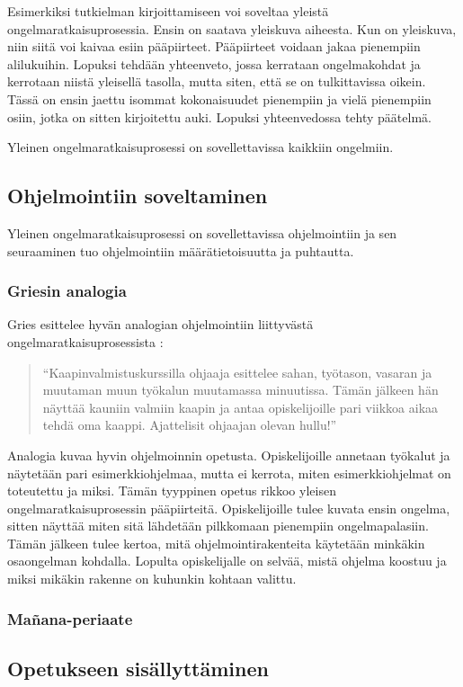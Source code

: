 Esimerkiksi tutkielman kirjoittamiseen voi soveltaa yleistä
ongelmaratkaisuprosessia. Ensin on saatava yleiskuva aiheesta. Kun on yleiskuva,
niin siitä voi kaivaa esiin pääpiirteet. Pääpiirteet voidaan jakaa pienempiin
alilukuihin. Lopuksi tehdään yhteenveto, jossa kerrataan ongelmakohdat ja
kerrotaan niistä yleisellä tasolla, mutta siten, että se on tulkittavissa
oikein. Tässä on ensin jaettu isommat kokonaisuudet pienempiin ja vielä
pienempiin osiin, jotka on sitten kirjoitettu auki. Lopuksi yhteenvedossa tehty
päätelmä.

Yleinen ongelmaratkaisuprosessi on sovellettavissa kaikkiin ongelmiin.

\subsection{Ohjelmointiin soveltaminen}

Yleinen ongelmaratkaisuprosessi on sovellettavissa ohjelmointiin ja sen
seuraaminen tuo ohjelmointiin määrätietoisuutta ja puhtautta.

\subsubsection{Griesin analogia}

Gries esittelee hyvän analogian ohjelmointiin liittyvästä
ongelmaratkaisuprosessista \cite{Gries:1974:WTI:953057.810447}:

\begin{quotation}
``Kaapinvalmistuskurssilla ohjaaja esittelee sahan, työtason, vasaran ja
muutaman muun työkalun muutamassa minuutissa. Tämän jälkeen hän näyttää
kauniin valmiin kaapin ja antaa opiskelijoille pari viikkoa aikaa tehdä oma
kaappi. Ajattelisit ohjaajan olevan hullu!''
\end{quotation}

Analogia kuvaa hyvin ohjelmoinnin opetusta. Opiskelijoille annetaan työkalut ja
näytetään pari esimerkkiohjelmaa, mutta ei kerrota, miten esimerkkiohjelmat on
toteutettu ja miksi. Tämän tyyppinen opetus rikkoo yleisen
ongelmaratkaisuprosessin pääpiirteitä. Opiskelijoille tulee kuvata ensin
ongelma, sitten näyttää miten sitä lähdetään pilkkomaan pienempiin
ongelmapalasiin. Tämän jälkeen tulee kertoa, mitä ohjelmointirakenteita
käytetään minkäkin osaongelman kohdalla. Lopulta opiskelijalle on selvää, mistä
ohjelma koostuu ja miksi mikäkin rakenne on kuhunkin kohtaan valittu.

\subsubsection{Mañana-periaate}


\subsection{Opetukseen sisällyttäminen}

